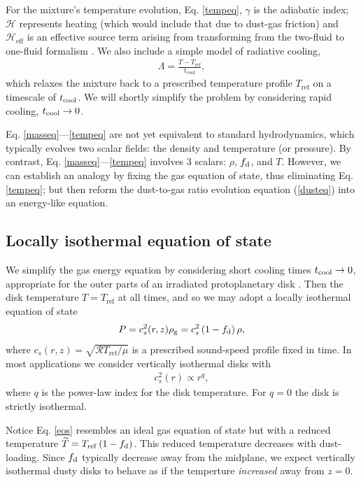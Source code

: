 For the mixture's temperature evolution, Eq. \ref{tempeq}, $\gamma$ is
the adiabatic index; $\mathcal{H}$ represents heating (which would
include that due to dust-gas friction) and $\mathcal{H}_\mathrm{eff}$
is an effective source term arising from transforming from the
two-fluid to one-fluid formalism \citep[see][ for
details]{laibe14}. We also include a simple model of radiative
cooling, 
\begin{align}
  \Lambda = \frac{T -
    T_\mathrm{ref}}{t_\mathrm{cool}}, \label{cooling} 
\end{align}
which relaxes the mixture back to a prescribed temperature profile   
$T_\mathrm{ref}$ on a timescale of $t_\mathrm{cool}$. We will shortly simplify
the problem by considering rapid cooling, $t_\mathrm{cool}\to0$. 

Eq. \ref{masseq}---\ref{tempeq} are not yet equivalent to standard 
hydrodynamics, which typically evolves two scalar fields: the density and
temperature (or pressure). By contrast, Eq. \ref{masseq}---\ref{tempeq}
involves 3 scalars: $\rho$, $f_\mathrm{d}$, and $T$. 
However, we can establish an  analogy by fixing the gas
equation of state, thus eliminating Eq. \ref{tempeq}; but then reform 
the dust-to-gas ratio evolution equation (\ref{dusteq}) into an
energy-like equation. 

\subsection{Locally isothermal equation of state}\label{loc_iso_eos}
We simplify the gas energy equation by considering short cooling 
times $t_\mathrm{cool}\to 0$, appropriate for the outer parts of an irradiated
protoplanetary disk \citep{chiang97,lin15}. Then the disk temperature
$T = T_\mathrm{ref}$ at all times, and so we may
adopt a locally isothermal equation of state 
\begin{align}\label{eos}
  P = c_s^2(r,z)\rho_\mathrm{g} = c_s^{2}\left(1 - f_\mathrm{d}\right)\rho,   
\end{align}
where $c_s(r,z)= \sqrt{\mathcal{R}T_\mathrm{ref}/\mu}$ is a prescribed
sound-speed profile fixed in time. In most applications we consider vertically 
isothermal disks with \begin{align}\label{power_temp}
  c_s^2(r) \propto r^{q},
\end{align}
where $q$ is the power-law index for the disk temperature. For $q=0$
the disk is strictly isothermal.  

Notice Eq. \ref{eos} resembles an ideal gas equation of state but with  
a reduced temperature $\widetilde{T} = 
T_\mathrm{ref}\left(1-f_\mathrm{d}\right)$. %
This reduced temperature decreases with dust-loading. 
Since $f_\mathrm{d}$ typically decrease away from the midplane, we expect
vertically isothermal dusty disks to behave as if the temperture
\emph{increased} away from $z=0$.     


